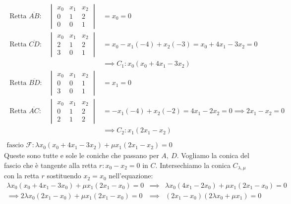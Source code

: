 \begin{solution}
		\begin{gather*}
			\begin{array}{lll}
			\text{Retta } \overline{AB} \colon & \begin{vmatrix}
					x_0 & x_1 & x_2 \\
					0 & 1 & 2 \\
					0 & 0 & 1 
				\end{vmatrix} & = x_0=0\\
			\text{Retta } \overline{CD} \colon & \begin{vmatrix}
				x_0 & x_1 & x_2 \\
				2 & 1 & 2 \\
				3 & 0 & 1 
			\end{vmatrix} & = x_0- x_1 (-4) + x_2(-3)=x_0 +4x_1-3x_2=0\\
			&& \implies C_1\colon x_0(x_0+4x_1-3x_2)\\
			\text{Retta } \overline{BD} \colon & \begin{vmatrix}
					x_0 & x_1 & x_2 \\
					0 & 0 & 1 \\
					3 & 0 & 1 
				\end{vmatrix} & = x_1=0\\
				\text{Retta } \overline{AC} \colon & \begin{vmatrix}
					x_0 & x_1 & x_2 \\
					0 & 1 & 2 \\
					2 & 1 & 2 
				\end{vmatrix} & = -x_1(-4) +x_2(-2)= 4x_1 -2x_2=0 \implies 2x_1-x_2=0\\
			&& \implies C_2 \colon x_1(2x_1-x_2) \\
			\end{array}\\
			\text{fascio } \mathcal{F}\colon \lambda x_0(x_0+4x_1-3x_2) +\mu x_1(2x_1-x_2)=0
		\end{gather*}
	Queste sono tutte e sole le coniche che passano per $A,\ D$. Vogliamo la conica del fascio che è tangente alla retta $r\colon x_0-x_2=0$ in $C$. Intersechiamo la conica $C_{\lambda,\mu}$ con la retta $r$ sostituendo $x_2=x_0$ nell'equazione:
		\begin{equation*}
			\begin{array}{lll}
				\lambda x_0(x_0+4x_1-3x_0)+\mu x_1(2x_1-x_0)=0 & \implies & \lambda x_0(4x_1-2x_0)+ \mu x_1(2x_1-x_0)=0\\
				\implies 2\lambda x_0(2x_1-x_0)+ \mu x_1(2x_1-x_0)=0 & \implies & (2x_1-x_0)(2\lambda x_0 +\mu x_1)=0

\end{array}
\end{equation*}
\end{solution}
